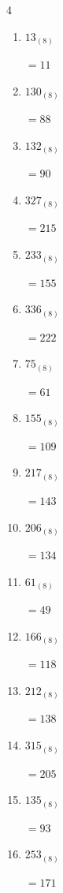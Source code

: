 \begin{multicols}{4}
\begin{enumerate}
        $=190$

  \item $13_{(8)}$

        $=11$

  \item $130_{(8)}$

        $=88$

\columnbreak %

  \item $132_{(8)}$

        $=90$

  \item $327_{(8)}$

        $=215$

  \item $233_{(8)}$

        $=155$

  \item $336_{(8)}$

        $=222$

  \item $75_{(8)}$

        $=61$

  \item $155_{(8)}$

        $=109$

  \item $217_{(8)}$

        $=143$

  \item $206_{(8)}$

        $=134$

  \item $61_{(8)}$

        $=49$

  \item $166_{(8)}$

        $=118$

  \item $212_{(8)}$

        $=138$

  \item $315_{(8)}$

        $=205$

  \item $135_{(8)}$

        $=93$

  \item $253_{(8)}$

        $=171$


\end{enumerate}
\end{multicols}

